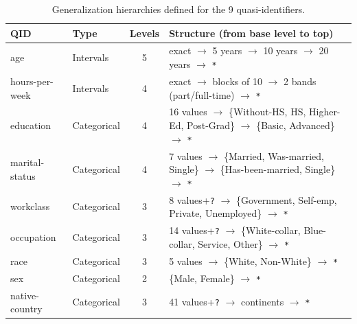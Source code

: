 \documentclass[10pt,a4paper]{article}
\begin{document}
\begin{table}[h]
\centering\footnotesize
\begin{tabular}{l l c p{8.0cm}}
\toprule
\textbf{QID} & \textbf{Type} & \textbf{Levels} & \textbf{Structure (from base level to top)} \\
\midrule
age            & Intervals & 5 & exact $\to$ 5 years $\to$ 10 years $\to$ 20 years $\to$ \texttt{*} \\
hours-per-week & Intervals & 4 & exact $\to$ blocks of 10 $\to$ 2 bands (part/full-time) $\to$ \texttt{*} \\
education      & Categorical & 4 & 16 values $\to$ \{Without-HS, HS, Higher-Ed, Post-Grad\} $\to$ \{Basic, Advanced\} $\to$ \texttt{*} \\
marital-status & Categorical & 4 & 7 values $\to$ \{Married, Was-married, Single\} $\to$ \{Has-been-married, Single\} $\to$ \texttt{*} \\
workclass      & Categorical & 3 & 8 values+\texttt{?} $\to$ \{Government, Self-emp, Private, Unemployed\} $\to$ \texttt{*} \\
occupation     & Categorical & 3 & 14 values+\texttt{?} $\to$ \{White-collar, Blue-collar, Service, Other\} $\to$ \texttt{*} \\
race           & Categorical & 3 & 5 values $\to$ \{White, Non-White\} $\to$ \texttt{*} \\
sex            & Categorical & 2 & \{Male, Female\} $\to$ \texttt{*} \\
native-country & Categorical & 3 & 41 values+\texttt{?} $\to$ continents $\to$ \texttt{*} \\
\bottomrule
\end{tabular}
\caption{Generalization hierarchies defined for the 9 quasi-identifiers.}
\label{tab:hier}
\end{table}
\end{document}
